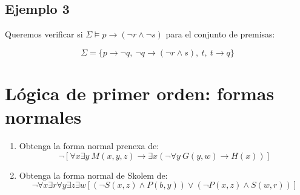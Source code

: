 \documentclass{article}
\begin{document}
\subsection{Ejemplo 3}

Queremos verificar si $\Sigma \vDash p \rightarrow (\neg r \land \neg s)$
para el conjunto de premisas:

$$\Sigma = \{p \rightarrow \neg q,\ \neg q \rightarrow (\neg r \land s), \ t,\ t\rightarrow q\}$$



\section{Lógica de primer orden: formas normales}

\begin{enumerate}
  \item Obtenga la forma normal prenexa de:
  $$\neg[\forall x \exists y\ M(x, y, z) \rightarrow \exists x (\neg \forall y\ G(y, w) \rightarrow H(x))]$$

  \item Obtenga la forma normal de Skolem de:
  $$\neg \forall x \exists r \forall y \exists z \exists w [(\neg S(x, z) \land P(b, y)) \vee (\neg P(x, z) \land S(w, r))]$$


\end{enumerate}
\end{document}
